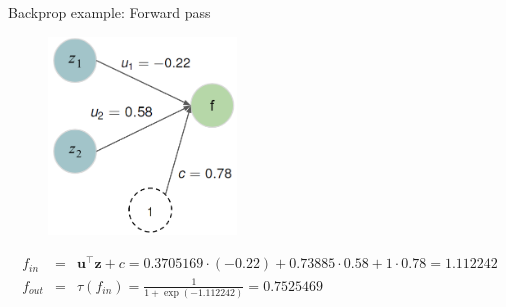 \begin{vbframe}{Backprop example: Forward pass}
\framebreak
  \begin{figure}
    \centering
      \includegraphics[width=5cm]{plots/forwardprop4b_new.png}
  \end{figure}

\vspace*{-0.5cm}

  \begin{footnotesize}
    \begin{eqnarray*}
    f_{in} &=& \bm{u}^\top \bm{z} + c = \num[round-mode=places,round-precision=4]{0.3705169} \cdot (-0.22) + \num[round-mode=places,round-precision=4]{0.73885} \cdot 0.58 + 1 \cdot 0.78 = \num[round-mode=places,round-precision=4]{1.112242} \\
    f_{out} &=& \tau\left(f_{in}\right) = \frac{1}{1+\exp(\num[round-mode=places,round-precision=4]{-1.112242})} = \num[round-mode=places,round-precision=4]{0.7525469}
    \end{eqnarray*}
  \end{footnotesize}


\end{vbframe}
